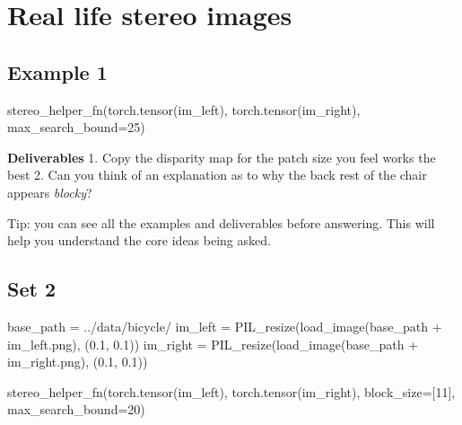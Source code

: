 \documentclass[
  letterpaper,
  DIV=11,
  numbers=noendperiod]{scrartcl}
\newenvironment{Shaded}{\begin{snugshade}}{\end{snugshade}}
\newcommand{\DecValTok}[1]{\textcolor[rgb]{0.68,0.00,0.00}{#1}}
\newcommand{\FloatTok}[1]{\textcolor[rgb]{0.68,0.00,0.00}{#1}}
\newcommand{\NormalTok}[1]{\textcolor[rgb]{0.00,0.23,0.31}{#1}}
\newcommand{\OperatorTok}[1]{\textcolor[rgb]{0.37,0.37,0.37}{#1}}
\newcommand{\StringTok}[1]{\textcolor[rgb]{0.13,0.47,0.30}{#1}}
\begin{document}
\hypertarget{real-life-stereo-images}{%
\section{Real life stereo images}\label{real-life-stereo-images}}

\hypertarget{example-1}{%
\subsection{Example 1}\label{example-1}}

\begin{Shaded}
\begin{Highlighting}[]
\NormalTok{stereo\_helper\_fn(torch.tensor(im\_left), torch.tensor(im\_right), max\_search\_bound}\OperatorTok{=}\DecValTok{25}\NormalTok{)}
\end{Highlighting}
\end{Shaded}

\textbf{Deliverables} 1. Copy the disparity map for the patch size you
feel works the best 2. Can you think of an explanation as to why the
back rest of the chair appears \emph{blocky}?

Tip: you can see all the examples and deliverables before answering.
This will help you understand the core ideas being asked.

\hypertarget{set-2}{%
\subsection{Set 2}\label{set-2}}

\begin{Shaded}
\begin{Highlighting}[]
\NormalTok{base\_path }\OperatorTok{=} \StringTok{\textquotesingle{}../data/bicycle/\textquotesingle{}}
\NormalTok{im\_left }\OperatorTok{=}\NormalTok{ PIL\_resize(load\_image(base\_path }\OperatorTok{+} \StringTok{\textquotesingle{}im\_left.png\textquotesingle{}}\NormalTok{), (}\FloatTok{0.1}\NormalTok{, }\FloatTok{0.1}\NormalTok{))}
\NormalTok{im\_right }\OperatorTok{=}\NormalTok{ PIL\_resize(load\_image(base\_path }\OperatorTok{+} \StringTok{\textquotesingle{}im\_right.png\textquotesingle{}}\NormalTok{), (}\FloatTok{0.1}\NormalTok{, }\FloatTok{0.1}\NormalTok{))}
\end{Highlighting}
\end{Shaded}

\begin{Shaded}
\begin{Highlighting}[]
\NormalTok{stereo\_helper\_fn(torch.tensor(im\_left), torch.tensor(im\_right), block\_size}\OperatorTok{=}\NormalTok{[}\DecValTok{11}\NormalTok{], max\_search\_bound}\OperatorTok{=}\DecValTok{20}\NormalTok{)}
\end{Highlighting}
\end{Shaded}
\end{document}
